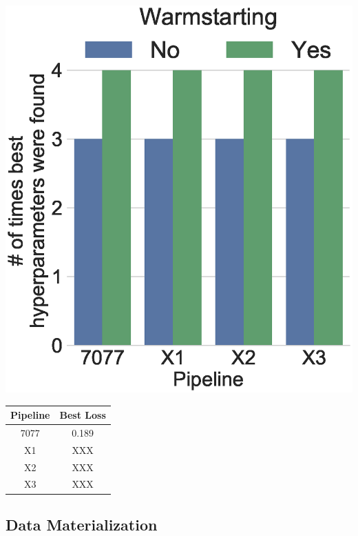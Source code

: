 \begin{minipage}{\columnwidth}
  \begin{minipage}[m]{0.49\columnwidth}
   \includegraphics[width=\columnwidth]{../images/experiment-results/task31-cold-starting-warm-besthyperparametersfound.eps}
     \label{figure-best-hyperparameters}
  \end{minipage}
  \hspace{0.5cm}
  \begin{minipage}[m]{0.49\columnwidth}
    \begin{tabular}{cc}\hline
      Pipeline & Best Loss \\ \hline
        7077 & 0.189 \\
        X1 & XXX \\
        X2 & XXX \\
        X3 & XXX\\ \hline
      \end{tabular}
      \label{table-best-hyperparameters}
    \end{minipage}
  \end{minipage}
\subsection{Data Materialization}